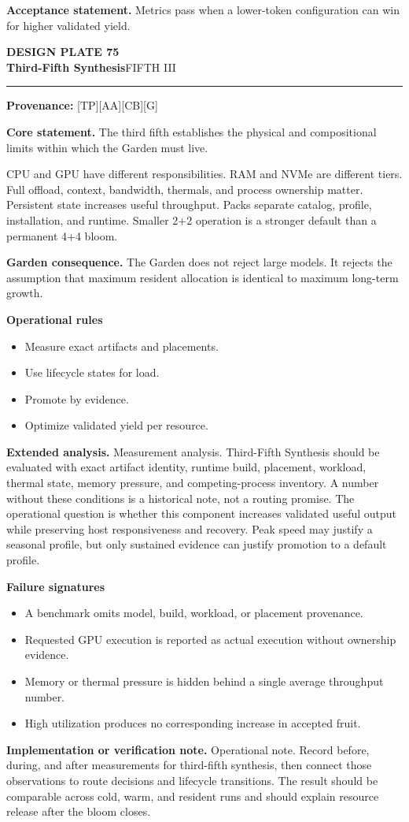\documentclass[10pt,letterpaper,oneside]{article}
\newcommand{\prov}[1]{\textcolor{gardenBlue}{\sffamily\footnotesize\textbf{Provenance:} #1}}
\newcommand{\platetitle}[3]{%
  \begin{minipage}[t][0.54in][t]{\textwidth}
  {\sffamily\bfseries\color{gardenDeep}\fontsize{9}{10}\selectfont DESIGN PLATE #1}\\[-1pt]
  {\sffamily\bfseries\color{gardenInk}\fontsize{16.5}{18}\selectfont #2}\hfill{\sffamily\color{gardenGreen}\large #3}
  \end{minipage}\vspace{-2pt}\hrule\vspace{5pt}}
\begin{document}
\begin{acceptbox}
\textbf{Acceptance statement.} Metrics pass when a lower-token configuration can win for higher validated yield.
\end{acceptbox}
\newpage
\platetitle{75}{Third-Fifth Synthesis}{FIFTH III}
\prov{[TP][AA][CB][G]}
\fontsize{8.85}{10.45}\selectfont
\begin{corebox}
\textbf{Core statement.} The third fifth establishes the physical and compositional limits within which the Garden must live.
\end{corebox}
CPU and GPU have different responsibilities. RAM and NVMe are different tiers. Full offload, context, bandwidth, thermals, and process ownership matter. Persistent state increases useful throughput. Packs separate catalog, profile, installation, and runtime. Smaller 2+2 operation is a stronger default than a permanent 4+4 bloom.

\textbf{Garden consequence.} The Garden does not reject large models. It rejects the assumption that maximum resident allocation is identical to maximum long-term growth.

\textbf{Operational rules}
\begin{itemize}
\item Measure exact artifacts and placements.
\item Use lifecycle states for load.
\item Promote by evidence.
\item Optimize validated yield per resource.
\end{itemize}
\textbf{Extended analysis.} Measurement analysis. Third-Fifth Synthesis should be evaluated with exact artifact identity, runtime build, placement, workload, thermal state, memory pressure, and competing-process inventory. A number without these conditions is a historical note, not a routing promise. The operational question is whether this component increases validated useful output while preserving host responsiveness and recovery. Peak speed may justify a seasonal profile, but only sustained evidence can justify promotion to a default profile.

\textbf{Failure signatures}
\begin{itemize}
\item A benchmark omits model, build, workload, or placement provenance.
\item Requested GPU execution is reported as actual execution without ownership evidence.
\item Memory or thermal pressure is hidden behind a single average throughput number.
\item High utilization produces no corresponding increase in accepted fruit.
\end{itemize}
\textbf{Implementation or verification note.} Operational note. Record before, during, and after measurements for third-fifth synthesis, then connect those observations to route decisions and lifecycle transitions. The result should be comparable across cold, warm, and resident runs and should explain resource release after the bloom closes.
\end{document}
